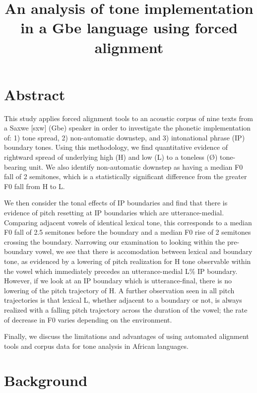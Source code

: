 \documentclass[
  11pt,
  b5paper,
]{article}
\title{An analysis of tone implementation in a Gbe language using forced
alignment}
\author{}
\date{}
\begin{document}
\maketitle

\hypertarget{abstract}{%
\section*{Abstract}\label{abstract}}

This study applies forced alignment tools to an acoustic corpus of nine
texts from a Saxwe {[}sxw{]} (Gbe) speaker in order to investigate the
phonetic implementation of: 1) tone spread, 2) non-automatic downstep,
and 3) intonational phrase (IP) boundary tones. Using this methodology,
we find quantitative evidence of rightward spread of underlying high (H)
and low (L) to a toneless (Ø) tone-bearing unit. We also identify
non-automatic downstep as having a median F0 fall of 2 semitones, which
is a statistically significant difference from the greater F0 fall from
H to L.

We then consider the tonal effects of IP boundaries and find that there
is evidence of pitch resetting at IP boundaries which are
utterance-medial. Comparing adjacent vowels of identical lexical tone,
this corresponds to a median F0 fall of 2.5 semitones before the
boundary and a median F0 rise of 2 semitones crossing the boundary.
Narrowing our examination to looking within the pre-boundary vowel, we
see that there is accomodation between lexical and boundary tone, as
evidenced by a lowering of pitch realization for H tone observable
within the vowel which immediately precedes an utterance-medial L\% IP
boundary. However, if we look at an IP boundary which is
utterance-final, there is no lowering of the pitch trajectory of H. A
further observation seen in all pitch trajectories is that lexical L,
whether adjacent to a boundary or not, is always realized with a falling
pitch trajectory across the duration of the vowel; the rate of decrease
in F0 varies depending on the environment.

Finally, we discuss the limitations and advantages of using automated
alignment tools and corpus data for tone analysis in African languages.

\hypertarget{background}{%
\section{Background}\label{background}}
\end{document}
